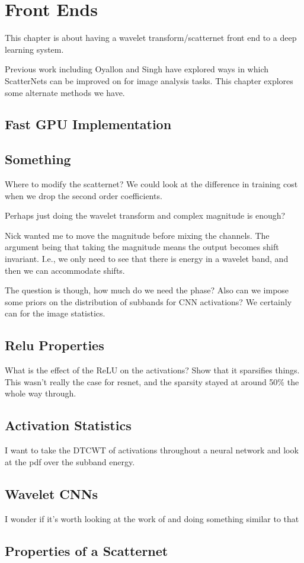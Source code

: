 \chapter{Front Ends}

This chapter is about having a wavelet transform/scatternet front end to a deep
learning system.

Previous work including Oyallon and Singh have explored ways in which
ScatterNets can be improved on for image analysis tasks. This chapter explores
some alternate methods we have.

\section{Fast GPU Implementation}

\section{Something}
Where to modify the scatternet? We could look at the difference in training cost
when we drop the second order coefficients.

Perhaps just doing the wavelet transform and complex magnitude is enough?

Nick wanted me to move the magnitude before mixing the channels. The argument
being that taking the magnitude means the output becomes shift invariant. I.e.,
we only need to see that there is energy in a wavelet band, and then we can
accommodate shifts.

The question is though, how much do we need the phase? Also can we impose some
priors on the distribution of subbands for CNN activations? We certainly can for
the image statistics.

\section{Relu Properties}
What is the effect of the ReLU on the activations? Show that it sparsifies
things. This wasn't really the case for resnet, and the sparsity stayed at around 50\% the whole way
through.

\section{Activation Statistics}
I want to take the DTCWT of activations throughout a neural network and look at
the pdf over the subband energy.

\section{Wavelet CNNs}
I wonder if it's worth looking at the work of \cite{fujieda_wavelet_2018} and doing something
similar to that 

\section{Properties of a Scatternet}
